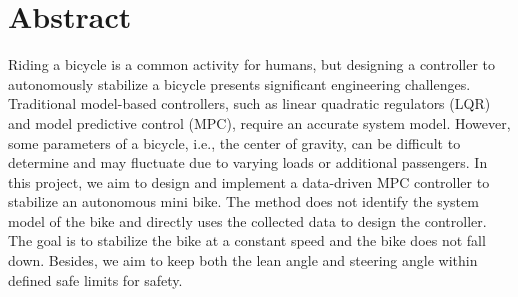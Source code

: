 \chapter*{Abstract}
Riding a bicycle is a common activity for humans, but designing a controller to autonomously stabilize a bicycle presents significant engineering challenges.
Traditional model-based controllers, such as linear quadratic regulators (LQR) and model predictive control (MPC), require an accurate system model. 
However, some parameters of a bicycle, i.e., the center of gravity, can be difficult to determine and may fluctuate due to varying loads or additional passengers. 
In this project, we aim to design and implement a data-driven MPC controller to stabilize an autonomous mini bike. 
The method does not identify the system model of the bike and directly uses the collected data to design the controller. The goal is to stabilize the bike at a constant speed and the bike does not fall down. 
Besides, we aim to keep both the lean angle and steering angle within defined safe limits for safety.